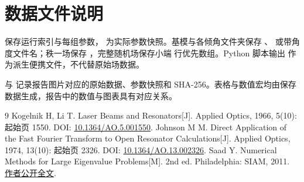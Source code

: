 \documentclass[UTF8,a4paper,11pt,fontset=fandol]{ctexart}
\begin{document}
\section{数据文件说明}
 保存运行索引与每组参数， 为实际参数快照。基模与各倾角文件夹保存 、 或带角度文件名；秩一场保存 ，完整随机场保存小端  行优先数组。Python 脚本输出  作为派生便携文件，不代替原始场数据。

 与  记录报告图片对应的原始数据、参数快照和 SHA-256。表格与数值宏均由保存数据生成，报告中的数值与图表具有对应关系。

\begin{thebibliography}{9}
 Kogelnik H, Li T. Laser Beams and Resonators[J]. Applied Optics, 1966, 5(10): 起始页 1550. DOI: \href{https://doi.org/10.1364/AO.5.001550}{10.1364/AO.5.001550}.
 Johnson M M. Direct Application of the Fast Fourier Transform to Open Resonator Calculations[J]. Applied Optics, 1974, 13(10): 起始页 2326. DOI: \href{https://doi.org/10.1364/AO.13.002326}{10.1364/AO.13.002326}.
 Saad Y. Numerical Methods for Large Eigenvalue Problems[M]. 2nd ed. Philadelphia: SIAM, 2011. \href{https://www-users.cse.umn.edu/~saad/eig_book_2ndEd.pdf}{作者公开全文}.
\end{thebibliography}
\end{document}

